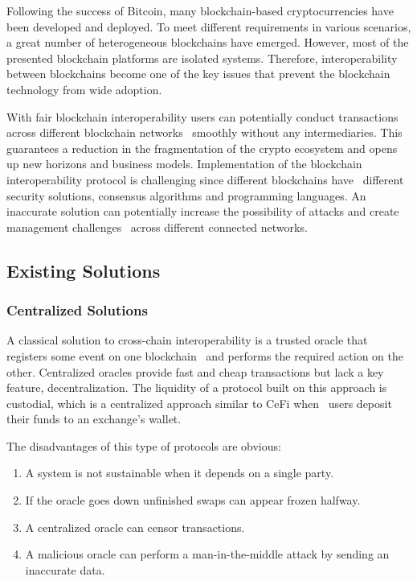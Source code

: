 Following the success of Bitcoin, many blockchain-based cryptocurrencies have been developed and deployed.
To meet different requirements in various scenarios, a great number of heterogeneous blockchains have emerged.
However, most of the presented blockchain platforms are isolated systems.
Therefore, interoperability between blockchains become one of the key issues
that prevent the blockchain technology from wide adoption.

With fair blockchain interoperability users can potentially conduct transactions across different blockchain networks \
smoothly without any intermediaries.
This guarantees a reduction in the fragmentation of the crypto ecosystem and opens up new horizons and business models.
Implementation of the blockchain interoperability protocol is challenging since different blockchains have \
different security solutions, consensus algorithms and programming languages.
An inaccurate solution can potentially increase the possibility of attacks and create management challenges \
across different connected networks.

\subsection{Existing Solutions}\label{subsec:existing-solutions}

\subsubsection{Centralized Solutions}\label{subsubsec:centralized-solutions}

A classical solution to cross-chain interoperability is a trusted oracle that registers some event on one blockchain \
and performs the required action on the other.
Centralized oracles provide fast and cheap transactions but lack a key feature, decentralization.
The liquidity of a protocol built on this approach is custodial, which is a centralized approach similar to CeFi when \
users deposit their funds to an exchange's wallet.

The disadvantages of this type of protocols are obvious:
\begin{enumerate}
    \item A system is not sustainable when it depends on a single party.
    \item If the oracle goes down unfinished swaps can appear frozen halfway.
    \item A centralized oracle can censor transactions.
    \item A malicious oracle can perform a man-in-the-middle attack by sending an inaccurate data.
\end{enumerate}

